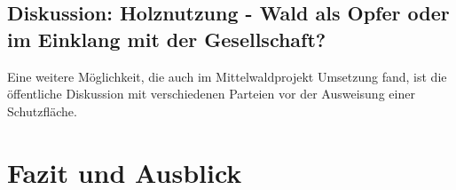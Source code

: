 \documentclass[12pt]{article}
\begin{document}
 

\subsection*{Diskussion: Holznutzung - Wald als Opfer oder im Einklang mit der Gesellschaft?}


Eine weitere Möglichkeit, die auch im Mittelwaldprojekt Umsetzung fand, ist die öffentliche Diskussion
mit verschiedenen Parteien vor der Ausweisung einer Schutzfläche. 

\section*{Fazit und Ausblick}
\end{document}
